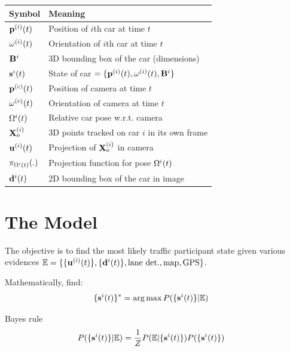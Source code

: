 \documentclass[10pt,twocolumn,letterpaper]{article}
\begin{document}
\begin{table}[h]
  \begin{tabular}{|l|l|}
    \hline
    Symbol & Meaning \\
    \hline
    $\mathbf{p}^{(i)}(t)$ & Position of $i$th car at time $t$\\
    $\mathbf{\omega}^{(i)}(t)$ & Orientation of $i$th car at time $t$\\
     $\mathbf{B}^{i}$ & 3D bounding box of the car (dimensions)\\
    $\mathbf{s}^{i}(t)$ & State of car $=\{\mathbf{p}^{(i)}(t), \mathbf{\omega}^{(i)}(t), \mathbf{B}^{i}\}$\\
    $\mathbf{p}^{(c)}(t)$ & Position of camera at time $t$\\
    $\mathbf{\omega}^{(c)}(t)$ & Orientation of camera at time $t$\\
    $\Omega^{i}(t)$ & Relative car pose w.r.t. camera \\
    $\mathbf{X}^{(i)}_o$ & 3D points tracked on car $i$ in its own frame\\
    $\mathbf{u}^{(i)}(t)$ & Projection of $\mathbf{X}^{(i)}_o$ in camera\\
    $\pi_{\Omega^{i}(t)}(.)$ & Projection function for pose $\Omega^{i}(t)$\\
    $\mathbf{d}^{i}(t)$ & 2D bounding box of the car in image\\
    \hline
  \end{tabular}
\end{table}

\section{The Model}

The objective is to find the most likely traffic participant state given various
evidences $\mathbb{E} = \{\{\mathbf{u}^{(i)}(t)\}, \{\mathbf{d}^{i}(t)\}, \text{lane det.}, \text{map},
\text{GPS}\}$.

Mathematically, find:
\begin{align}
  \{\mathbf{s}^{i}(t)\}^* &= \arg \max P(\{\mathbf{s}^{i}(t)\} | \mathbb{E})
\end{align}

Bayes rule
\begin{align}
  P(\{\mathbf{s}^{i}(t)\} | \mathbb{E}) &=
  \frac{1}{Z}P( \mathbb{E} | \{\mathbf{s}^{i}(t)\})P(\{\mathbf{s}^{i}(t)\})
\end{align}
\end{document}
